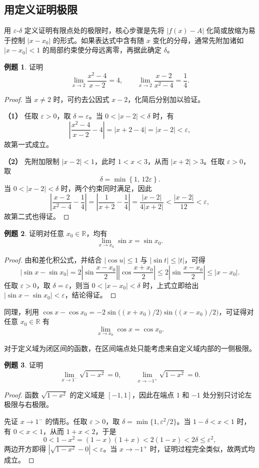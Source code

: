 \documentclass[UTF8,fontset=fandol,a4paper,12pt]{ctexart}
\newcommand{\R}{\mathbb R}
\theoremstyle{definition}
\newtheorem*{example}{例题}
\begin{document}
\subsection*{用定义证明极限}
用 $\varepsilon$-$\delta$ 定义证明有限点处的极限时，核心步骤是先将 $|f(x)-A|$ 化简或放缩为易于控制 $|x-x_0|$ 的形式。如果表达式中含有随 $x$ 变化的分母，通常先附加诸如 $|x-x_0|<1$ 的局部约束使分母远离零，再据此确定 $\delta$。

\begin{example}
证明
\[
 \lim_{x\to2}\frac{x^2-4}{x-2}=4,
 \qquad
 \lim_{x\to2}\frac{x-2}{x^2-4}=\frac14.
\]
\end{example}
\begin{proof}
当 $x\ne2$ 时，可约去公因式 $x-2$，化简后分别加以验证。

\textbf{（1）} 任取 $\varepsilon>0$，取 $\delta=\varepsilon$。当 $0<|x-2|<\delta$ 时，有
\[
 \left|\frac{x^2-4}{x-2}-4\right|=|x+2-4|=|x-2|<\varepsilon,
\]
故第一式成立。

\textbf{（2）} 先附加限制 $|x-2|<1$，此时 $1<x<3$，从而 $|x+2|>3$。任取 $\varepsilon>0$，取
\[
 \delta=\min\left\{1,\,12\varepsilon\right\}.
\]
当 $0<|x-2|<\delta$ 时，两个约束同时满足，因此
\[
 \left|\frac{x-2}{x^2-4}-\frac14\right|
 =\left|\frac1{x+2}-\frac14\right|
 =\frac{|x-2|}{4|x+2|}
 <\frac{|x-2|}{12}<\varepsilon,
\]
故第二式也得证。
\end{proof}

\begin{example}
证明对任意 $x_0\in\R$，均有
\[
 \lim_{x\to x_0}\sin x=\sin x_0.
\]
\end{example}
\begin{proof}
由和差化积公式，并结合 $|\cos u|\le1$ 与 $|\sin t|\le |t|$，可得
\[
 |\sin x-\sin x_0|
 =2\left|\sin\frac{x-x_0}{2}\right|\left|\cos\frac{x+x_0}{2}\right|
 \le 2\left|\sin\frac{x-x_0}{2}\right|
 \le |x-x_0|.
\]
任取 $\varepsilon>0$，取 $\delta=\varepsilon$，则当 $0<|x-x_0|<\delta$ 时，上式立即给出 $|\sin x-\sin x_0|<\varepsilon$，结论得证。
\end{proof}

同理，利用 $\cos x-\cos x_0=-2\sin\bigl((x+x_0)/2\bigr)\sin\bigl((x-x_0)/2\bigr)$，可证得对任意 $x_0\in\R$ 有
\[
 \lim_{x\to x_0}\cos x=\cos x_0.
\]

对于定义域为闭区间的函数，在区间端点处只能考虑来自定义域内部的一侧极限。

\begin{example}
证明
\[
 \lim_{x\to1^-}\sqrt{1-x^2}=0,
 \qquad
 \lim_{x\to-1^+}\sqrt{1-x^2}=0.
\]
\end{example}
\begin{proof}
函数 $\sqrt{1-x^2}$ 的定义域是 $[-1,1]$，因此在端点 $1$ 和 $-1$ 处分别只讨论左极限与右极限。

先证 $x\to1^-$ 的情形。任取 $\varepsilon>0$，取 $\delta=\min\{1,\varepsilon^2/2\}$。当 $1-\delta<x<1$ 时，有 $0<x<1$，从而 $1+x<2$，于是
\[
 0<1-x^2=(1-x)(1+x)<2(1-x)<2\delta\le\varepsilon^2,
\]
两边开方即得 $|\sqrt{1-x^2}-0|<\varepsilon$。当 $x\to-1^+$ 时，证明过程完全类似，故两式均成立。
\end{proof}
\end{document}
